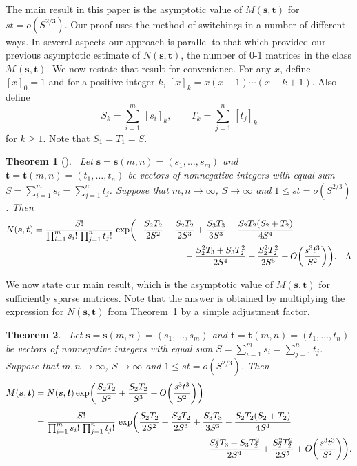 \documentclass[12pt]{article}
\newtheorem{theorem}{Theorem}[section]
\numberwithin{equation}{section}
\def\M{{\mathcal{M}}}
\def\svec{{\boldsymbol{s}}}
\def\tvec{{\boldsymbol{t}}}
\def\Mst{{\M(\svec,\tvec)}}
\begin{document}
\bigskip

The main result in this paper is the asymptotic value of
$M(\svec,\tvec)$ for $st=o(S^{2/3})$.
Our proof uses the method of switchings in a number of different ways.  
In several aspects our approach is parallel to that
which provided our previous asymptotic
estimate of $N(\svec,\tvec)$, the number of 0-1 matrices in the class
$\Mst$. We now restate that result for convenience.
For any $x$, define $[x]_0 = 1$ and for a positive integer $k$,
$[x]_k = x(x-1)\cdots (x-k+1)$.  Also define
\[ S_k = \sum_{i=1}^m \,[s_i]_k,\qquad
   T_k = \sum_{j=1}^n \,[t_j]_k\]
for $k\geq 1$.  Note that $S_1 = T_1 = S$.


\begin{theorem}[{\cite[Corollary 5.1]{GMW}}]\label{main01}
~Let $\svec = \svec(m,n) = (s_1,\ldots ,s_m)$
and $\tvec = \tvec(m,n) = (t_1,\ldots ,t_n)$
be vectors of nonnegative integers with
equal sum $S = \sum_{i=1}^m s_i = \sum_{j=1}^n t_j$.
Suppose that $m,n\to\infty$, $S\to\infty$
and\/ $1\le st=o(S^{2/3})$.  Then
\begin{align*}
N(\svec,\tvec) 
    & = \frac{S!}{\prod_{i=1}^m s_i!\, \prod_{j=1}^n t_j!}
    \,\exp\biggl(-\frac{S_2T_2}{2S^2} - \frac{S_2T_2}{2S^3} +
    \frac{S_3T_3}{3S^3}
        - \frac{S_2T_2(S_2+T_2)}{4S^4} \\
           &{\kern 60mm} - \frac{S_2^2T_3+S_3T_2^2}{2S^4} + \frac{
             S_2^2T_2^2}{2S^5}
                    + O\biggl(\frac{s^3t^3}{S^2}\biggr)\biggr).
                      \quad\qedsymbol
\end{align*}
\end{theorem}

\bigskip

We now state our main result, which is the asymptotic value
of $M(\svec,\tvec)$ for sufficiently sparse matrices.  Note
that the answer is obtained by multiplying the expression
for $N(\svec,\tvec)$ from Theorem~\ref{main01} by a simple
adjustment factor.

\begin{theorem}\label{main}
~Let $\svec = \svec(m,n) = (s_1,\ldots ,s_m)$
and $\tvec = \tvec(m,n) = (t_1,\ldots ,t_n)$
be vectors of nonnegative integers with
equal sum $S = \sum_{i=1}^m s_i = \sum_{j=1}^n t_j$.
Suppose that $m,n\to\infty$, $S\to\infty$
and\/ $1\le st=o(S^{2/3})$.  Then
\begin{align*}
M(\svec,\tvec) &= N(\svec,\tvec)
  \exp\biggl(\frac{S_2T_2}{S^2} + \frac{S_2T_2}{S^3}
    + O\biggl(\frac{s^3t^3}{S^2}\biggr)\biggr) \\[1ex]
    & = \frac{S!}{\prod_{i=1}^m s_i!\, \prod_{j=1}^n t_j!}
    \,\exp\biggl(\frac{S_2T_2}{2S^2} + \frac{S_2T_2}{2S^3} +
    \frac{S_3T_3}{3S^3}
        - \frac{S_2T_2(S_2+T_2)}{4S^4} \\
           &{\kern 64mm} - \frac{S_2^2T_3+S_3T_2^2}{2S^4} + \frac{
             S_2^2T_2^2}{2S^5}
                    + O\biggl(\frac{s^3t^3}{S^2}\biggr)\biggr).
                      \end{align*}
\end{theorem}
\end{document}
